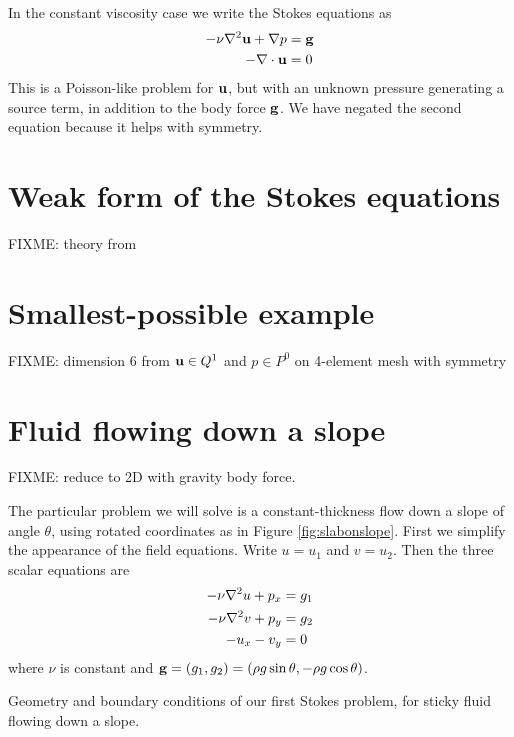 In the constant viscosity case we write the Stokes equations as
\begin{align}
- \nu \nabla^2 \mathbf{u} + \nabla p &= \mathbf{g} \\
- \nabla\cdot \mathbf{u} &= 0
\end{align}
This is a Poisson-like problem for $\mathbf{u}$, but with an unknown pressure generating a source term, in addition to the body force $\mathbf{g}$.  We have negated the second equation because it helps with symmetry.


\section{Weak form of the Stokes equations}

FIXME: theory from \citep{Braess2007,Elmanetal2005}



\section{Smallest-possible example}

FIXME: dimension 6 from $\mathbf{u}\in Q^1$ and $p\in P^0$ on 4-element mesh with symmetry


\section{Fluid flowing down a slope}

FIXME: reduce to 2D with gravity body force.

The particular problem we will solve is a constant-thickness flow down a slope of angle $\theta$, using rotated coordinates as in Figure \ref{fig:slabonslope}.  First we simplify the appearance of the field equations.  Write $u=u_1$ and $v=u_2$.  Then the three scalar equations are
\begin{align}
-\nu \nabla^2 u + p_x &= g_1 \label{stokes2du} \\
-\nu \nabla^2 v + p_y &= g_2 \label{stokes2dv} \\
- u_x - v_y &= 0 \label{stokes2dincomp}
\end{align}
where $\nu$ is constant and $\mathbf{g} = (g_1,g_2) = (\rho g \sin \theta, - \rho g \cos \theta)$.

\begin{marginfigure}

\caption{Geometry and boundary conditions of our first Stokes problem, for sticky fluid flowing down a slope.}
\label{fig:slabonslope}
\end{marginfigure}

